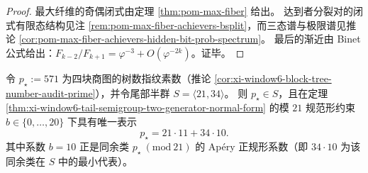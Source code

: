 \begin{proof}
最大纤维的奇偶闭式由定理 \ref{thm:pom-max-fiber} 给出。
达到者分裂对的闭式有限态结构见注 \ref{rem:pom-max-fiber-achievers-bsplit}，而三态谱与极限谱见推论 \ref{cor:pom-max-fiber-achievers-hidden-bit-prob-spectrum}。
最后的渐近由 Binet 公式给出：\(F_{k-2}/F_{k+1}=\varphi^{-3}+O(\varphi^{-2k})\)。证毕。
\end{proof}

\begin{corollary}[审计素数 \texorpdfstring{$p_\star=571$}{p*=571} 的尾部半群 Ap\'ery 正规形与唯一性]\label{cor:xi-audit-prime-571-apery-normal-form}
令 \(p_\star:=571\) 为四块商图的树数指纹素数（推论 \ref{cor:xi-window6-block-tree-number-audit-prime}），并令尾部半群 \(S=\langle 21,34\rangle\)。
则 \(p_\star\in S\)，且在定理 \ref{thm:xi-window6-tail-semigroup-two-generator-normal-form} 的模 \(21\) 规范形约束 \(b\in\{0,\dots,20\}\) 下具有唯一表示
\[
p_\star=21\cdot 11+34\cdot 10.
\]
其中系数 \(b=10\) 正是同余类 \(p_\star\ (\mathrm{mod}\ 21)\) 的 Ap\'ery 正规形系数（即 \(34\cdot 10\) 为该同余类在 \(S\) 中的最小代表）。
\end{corollary}

